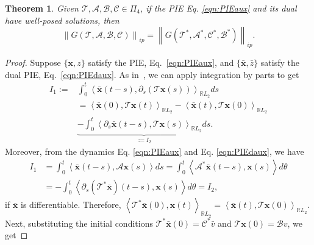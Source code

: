 \documentclass[letterpaper, 10 pt, conference]{ieeeconf}
\newcommand{\R}{\mathbb{R}}
\newcommand{\ip}[2]{\left\langle #1,#2\right\rangle}
\newcommand{\mcl}[1]{\mathcal{#1}}
\newcommand{\mbf}[1]{\mathbf{#1}}
\newcommand{\norm}[1]{\left\lVert #1 \right\rVert}
\newtheorem{theorem}{Theorem} %
\theoremstyle{definition}
\begin{document}
\begin{theorem}\label{thm:dualityI2P}
    Given $\mcl{T,A}, \mcl B, \mcl C \in \Pi_4$, if the PIE Eq. \eqref{eqn:PIEaux} and its dual have well-posed solutions, then
    \[
    \norm{G(\mcl T, \mcl A,\mcl B,\mcl C)}_{ip}=\norm{G(\mcl T^*, \mcl A^*,\mcl C^*,\mcl B^*)}_{ip}.
    \]
\end{theorem}
\begin{proof}
    Suppose $\{\mbf x, z\}$ satisfy the PIE, Eq.~\eqref{eqn:PIEaux}, and $\{\bar{\mbf x}, \bar z\}$ satisfy the dual PIE, Eq.~\eqref{eqn:PIEdaux}. As in~\cite{shivakumar_dual_2024}, we can apply integration by parts to get
    \begin{align*}
       I_1:=& \int_0^t \ip{\bar{\mbf x}(t-s)}{\partial_s(\mcl T \mbf x(s))}_{\R L_2}ds
       \\&= \ip{\bar{\mbf x}(0)}{\mcl T \mbf x(t)}_{\R L_2}-\ip{\bar{\mbf x}(t)}{\mcl T \mbf x(0)}_{\R L_2}\\& \underbrace{-\int_0^t \ip{\partial_s\bar{\mbf x}(t-s)}{\mcl T \mbf x(s)}_{\R L_2} ds}_{:=I_2}.
    \end{align*}
Moreover, from the dynamics Eq. \eqref{eqn:PIEaux} and Eq. \eqref{eqn:PIEdaux}, we have
\begin{align*}
    I_1&=\int_0^t \ip{\bar{\mbf x}(t-s)}{\mcl A \mbf x(s)}ds 
    = \int_0^t \ip{\mcl A^*\bar{\mbf x}(t-s)}{\mbf x(s)}d\theta\\
    &= -\int_0^t \ip{\partial_s(\mcl T^*\bar{\mbf x})(t-s)}{\mbf x(s)}d\theta = I_2,
\end{align*}
if $\bar{\mbf x}$ is differentiable.
Therefore, $\ip{\mcl T^*\bar{\mbf x}(0)}{\mbf x(t)}_{\R L_2}=\ip{\bar{\mbf x}(t)}{\mcl T\mbf x(0)}_{\R L_2}$. Next, substituting the initial conditions $\mcl T^*\bar{\mbf x}(0) = \mcl C^* \bar v$ and $\mcl T \mbf x(0)=\mcl B v$, we get

\end{proof}
\end{document}
